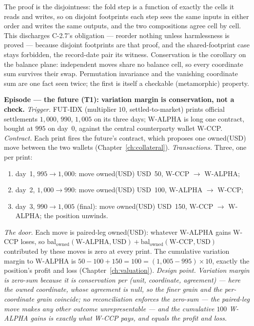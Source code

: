 \documentclass[11pt,a4paper]{article}
\newcommand{\USD}[1]{\mbox{USD~#1}}
\begin{document}
The proof is the disjointness: the fold step is a function of exactly the cells it reads
and writes, so on disjoint footprints each step sees the same inputs in either order and
writes the same outputs, and the two compositions agree cell by cell. This discharges
C-2.7's obligation --- reorder nothing unless harmlessness is proved --- because disjoint
footprints are that proof, and the shared-footprint case stays forbidden, the record-date
pair its witness. Conservation is the corollary on the balance plane: independent moves
share no balance cell, so every coordinate sum survives their swap. Permutation invariance
and the vanishing coordinate sum are one fact seen twice; the first is itself a checkable
(metamorphic) property.

\medskip\noindent\textbf{Episode --- the future (T1): variation margin is
conservation, not a check.}
\emph{Trigger.} FUT-IDX (multiplier $10$, settled-to-market) prints official
settlements $1{,}000$, $990$, $1{,}005$ on its three days; W-ALPHA is long one
contract, bought at $995$ on day~0, against the central counterparty wallet
W-CCP. \emph{Contract.} Each print fires the future's contract, which proposes one
owned(USD) move between the two wallets (Chapter~\ref{ch:collateral}).
\emph{Transactions.} Three, one per print:
\begin{enumerate}[label=(\arabic*),nosep,leftmargin=2.2em]
\item day~1, $995\!\to\!1{,}000$: move owned(USD) \USD{50}, W-CCP $\to$ W-ALPHA;
\item day~2, $1{,}000\!\to\!990$: move owned(USD) \USD{100}, W-ALPHA $\to$ W-CCP;
\item day~3, $990\!\to\!1{,}005$ (final): move owned(USD) \USD{150}, W-CCP $\to$
  W-ALPHA; the position unwinds.
\end{enumerate}
\emph{The door.} Each move is paired-leg owned(USD): whatever W-ALPHA gains W-CCP
loses, so $\mathrm{bal}_{\text{owned}}(\text{W-ALPHA},\text{USD}) +
\mathrm{bal}_{\text{owned}}(\text{W-CCP},\text{USD})$ contributed by these moves is
zero at every print. The cumulative variation margin to W-ALPHA is
$50-100+150 = 100 = (1{,}005-995)\times 10$, exactly the position's profit and
loss (Chapter~\ref{ch:valuation}).
\emph{Design point.} \emph{Variation margin is zero-sum because it is
conservation per (unit, coordinate, agreement) --- here the owned coordinate, whose
agreement is null, so the finer grain and the per-coordinate grain coincide; no
reconciliation enforces the zero-sum ---
the paired-leg move makes any other outcome unrepresentable --- and the cumulative
$100$ W-ALPHA gains is exactly what W-CCP pays, and equals the profit and loss.}
\end{document}
